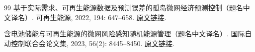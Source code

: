 \documentclass[UTF8,a4paper,12pt,fontset=fandol]{ctexart}
\numberwithin{equation}{section}
\begin{document}
\clearpage
\begin{thebibliography}{99}
基于实际需求、可再生能源数据及预测误差的孤岛微网经济预测控制（题名中文译名）.
可再生能源, 2022, 194: 647--658.
\href{https://doi.org/10.1016/j.renene.2022.05.103}{原文链接}.

含电池储能与可再生能源的微网风险感知随机能源管理（题名中文译名）.
国际自动控制联合会论文集, 2023, 56(2): 8445--8450.
\href{https://doi.org/10.1016/j.ifacol.2023.10.1042}{原文链接}.
\end{thebibliography}
\end{document}

